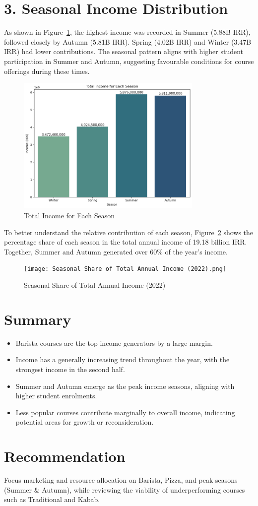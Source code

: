 \documentclass[12pt,a4paper]{article}
\begin{document}
\section*{3. Seasonal Income Distribution}

As shown in Figure~\ref{fig:income-by-season}, the highest income was recorded in Summer (5.88B IRR), followed closely by Autumn (5.81B IRR). Spring (4.02B IRR) and Winter (3.47B IRR) had lower contributions. The seasonal pattern aligns with higher student participation in Summer and Autumn, suggesting favourable conditions for course offerings during these times.

\begin{figure}[h!]
    \centering
    \includegraphics[width=0.8\textwidth]{Total Income for Each Season.png}
    \caption{Total Income for Each Season}
    \label{fig:income-by-season}
\end{figure}

To better understand the relative contribution of each season, Figure~\ref{fig:seasonal-share} shows the percentage share of each season in the total annual income of 19.18 billion IRR. Together, Summer and Autumn generated over 60\% of the year's income.

\begin{figure}[h!]
    \centering
    \texttt{[image: Seasonal Share of Total Annual Income (2022).png]}
    \caption{Seasonal Share of Total Annual Income (2022)}
    \label{fig:seasonal-share}
\end{figure}

\section*{Summary}

\begin{itemize}
    \item Barista courses are the top income generators by a large margin.
    \item Income has a generally increasing trend throughout the year, with the strongest income in the second half.
    \item Summer and Autumn emerge as the peak income seasons, aligning with higher student enrolments.
    \item Less popular courses contribute marginally to overall income, indicating potential areas for growth or reconsideration.
\end{itemize}

\section*{Recommendation}
Focus marketing and resource allocation on Barista, Pizza, and peak seasons (Summer \& Autumn), while reviewing the viability of underperforming courses such as Traditional and Kabab.
\end{document}
